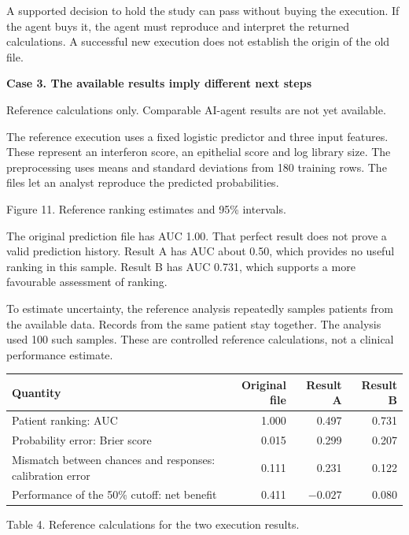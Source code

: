 \documentclass[10pt,a4paper]{article}
\newcommand{\reportcase}[2]{{\Large\bfseries Case #1. #2\par}\vspace{2mm}}
\newcommand{\reportcaption}[1]{\par{\small\color{Muted}#1\par}\vspace{1mm}}
\newcommand{\reportstatus}[1]{{\small\color{Muted}#1\par}\vspace{1mm}}
\begin{document}
A supported decision to hold the study can pass without buying the execution. If the agent buys it, the agent must reproduce and interpret the returned calculations. A successful new execution does not establish the origin of the old file.

\newpage
\reportcase{3}{The available results imply different next steps}
\reportstatus{Reference calculations only. Comparable AI-agent results are not yet available.}
The reference execution uses a fixed logistic predictor and three input features. These represent an interferon score, an epithelial score and log library size. The preprocessing uses means and standard deviations from 180 training rows. The files let an analyst reproduce the predicted probabilities.

\begin{center}
\end{center}
\reportcaption{Figure 11. Reference ranking estimates and 95\% intervals.}

The original prediction file has AUC 1.00. That perfect result does not prove a valid prediction history. Result A has AUC about 0.50, which provides no useful ranking in this sample. Result B has AUC 0.731, which supports a more favourable assessment of ranking.

To estimate uncertainty, the reference analysis repeatedly samples patients from the available data. Records from the same patient stay together. The analysis used 100 such samples. These are controlled reference calculations, not a clinical performance estimate.

\begin{tabularx}{\textwidth}{@{}Yrrr@{}}\toprule
Quantity & Original file & Result A & Result B \\\midrule
Patient ranking: AUC & 1.000 & 0.497 & 0.731 \\
Probability error: Brier score & 0.015 & 0.299 & 0.207 \\
Mismatch between chances and responses: calibration error & 0.111 & 0.231 & 0.122 \\
Performance of the 50\% cutoff: net benefit & 0.411 & $-0.027$ & 0.080 \\\bottomrule
\end{tabularx}
\reportcaption{Table 4. Reference calculations for the two execution results.}
\end{document}
